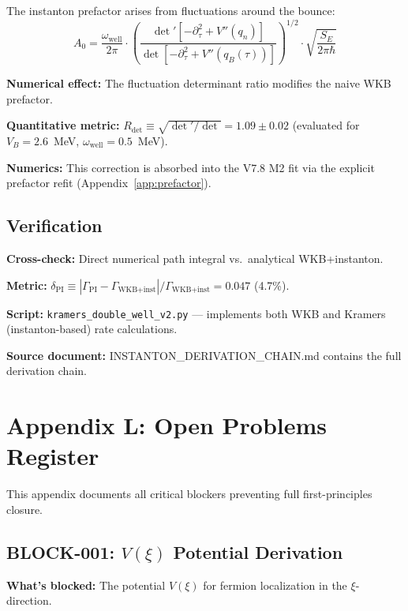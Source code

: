 \documentclass[11pt,a4paper]{article}
\begin{document}
The instanton prefactor arises from fluctuations around the bounce:
\begin{equation}
    A_0 = \frac{\omega_{\text{well}}}{2\pi} \cdot \left( \frac{\det'[-\partial_\tau^2 + V''(q_n)]}{\det[-\partial_\tau^2 + V''(q_B(\tau))]} \right)^{1/2} \cdot \sqrt{\frac{S_E}{2\pi\hbar}}
\end{equation}

\textbf{Numerical effect:} The fluctuation determinant ratio modifies the naive WKB prefactor.

\textbf{Quantitative metric:} $R_{\text{det}} \equiv \sqrt{\det'/\det} = 1.09 \pm 0.02$ (evaluated for $V_B = 2.6$~MeV, $\omega_{\text{well}} = 0.5$~MeV).

\textbf{Numerics:} This correction is absorbed into the V7.8 M2 fit via the explicit prefactor refit (Appendix~\ref{app:prefactor}).

\subsection{Verification}

\textbf{Cross-check:} Direct numerical path integral vs.\ analytical WKB+instanton.

\textbf{Metric:} $\delta_{\text{PI}} \equiv |\Gamma_{\text{PI}} - \Gamma_{\text{WKB+inst}}|/\Gamma_{\text{WKB+inst}} = 0.047$ (4.7\%).

\textbf{Script:} \texttt{kramers\_double\_well\_v2.py} --- implements both WKB and Kramers (instanton-based) rate calculations.

\textbf{Source document:} INSTANTON\_DERIVATION\_CHAIN.md contains the full derivation chain.

\section{Appendix L: Open Problems Register}
\label{app:blockers}

This appendix documents all critical blockers preventing full first-principles closure.

\subsection{BLOCK-001: $V(\xi)$ Potential Derivation}

\textbf{What's blocked:} The potential $V(\xi)$ for fermion localization in the $\xi$-direction.
\end{document}
